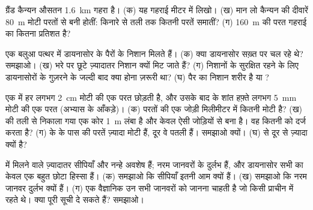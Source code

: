 \begin{exercise}[$\star\star$]\label{exo:g7:sediments-and-fossils:9}
ग्रैंड कैन्यन औसतन \qty{1.6}{km} गहरा है। (क) यह गहराई मीटर में लिखो। (ख) मान लो
कैन्यन की दीवारें \qty{80}{m} मोटी परतों से बनी होतीं: किनारे से तली तक कितनी परतें
समातीं? (ग) \qty{160}{m} की परत गहराई का
कितना प्रतिशत है?
\end{exercise}

\begin{exercise}[$\star\star$]\label{exo:g7:sediments-and-fossils:10}
एक बलुआ पत्थर में डायनासोर के पैरों के निशान मिलते हैं। (क) क्या डायनासोर सख़्त
 पर चल रहे थे? समझाओ। (ख)  भरे  पर छूटे ज़्यादातर निशान क्यों मिट
जाते हैं? (ग) निशानों के सुरक्षित रहने के लिए डायनासोरों के गुज़रने के जल्दी बाद क्या
होना ज़रूरी था? (घ) पैर का निशान शरीर  है या
?
\end{exercise}

\begin{exercise}[$\star\star\star$]\label{exo:g7:sediments-and-fossils:11}
एक  में हर  लगभग \qty{2}{cm} मोटी  की एक परत छोड़ती है, और उसके बाद के
शांत हफ़्ते लगभग \qty{5}{mm} मोटी  की एक परत (अभ्यास के आँकड़े)। (क) परतों
की एक जोड़ी मिलीमीटर में कितनी मोटी है? (ख)  की तली से निकाला गया एक कोर
\qty{1}{m} लंबा है और केवल ऐसी जोड़ियों से बना है। वह कितनी  को दर्ज करता है?
(ग)  के  के पास  की परतें ज़्यादा मोटी हैं, दूर वे पतली हैं। समझाओ
क्यों। (घ)  से दूर  से ज़्यादा 
क्यों है?
\end{exercise}

\begin{exercise}[$\star\star\star$]\label{exo:g7:sediments-and-fossils:12}
 में मिलने वाले  ज़्यादातर सीपियाँ और नन्हे अवशेष हैं; नरम जानवरों के
 दुर्लभ हैं, और डायनासोर सभी  का केवल एक बहुत छोटा हिस्सा हैं।
(क) समझाओ कि सीपियाँ इतनी आम क्यों हैं। (ख) समझाओ कि नरम जानवर दुर्लभ क्यों हैं।
(ग) एक वैज्ञानिक उन सभी जानवरों को जानना चाहती है जो किसी प्राचीन  में रहते
थे। क्या  पूरी सूची दे सकते हैं? समझाओ।
\end{exercise}

